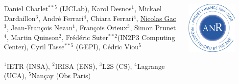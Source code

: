 \documentclass[usenames,dvipsnames]{beamer}
\begin{document}
{{    \vspace{0.1cm}

    \begin{columns}[t]
        \begin{column}{.85\linewidth}
   \begin{center}
   \tiny{
\begin{minipage}{\linewidth}
   Daniel Charlet$^{**5}$ (IJCLab), Karol Desnos$^{1}$, Mickael Dardaillon$^{3}$, André Ferrari$^{4}$, Chiara Ferrari$^{4}$, \underline{Nicolas Gac$^{3}$}, Jean-François Nezan$^{1}$, François Orieux$^{3}$, Simon Prunet$^{4}$, Martin Quinson$^{2}$, Frédéric Suter$^{**2}$(IN2P3 Computing Center), Cyril Tasse$^{**5}$ (GEPI), Cédric Viou$^{5}$\\
   \\
   $^{1}$IETR (INSA),  $^{2}$IRISA (ENS), $^{3}$L2S (CS), $^{4}$Lagrange (UCA),  $^{5}$Nançay (Obs Paris) 
\end{minipage}
   }
\end{center}
\end{column}
\begin{column}{.15\linewidth}
    \begin{center}
        \includegraphics[width=0.75\textwidth]{anr-light.pdf}    \\ 
        \tiny{ }
    \end{center}
    \end{column}
\end{columns}
}
}
\frame[noframenumbering]{\tableofcontents}
\end{document}
